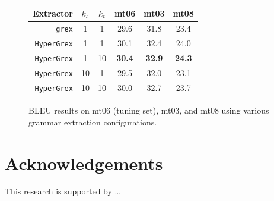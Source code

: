 \documentclass[nofonts]{pbml} %
\begin{document}
\begin{figure}[ht!]
\centering
\begin{tabular}{r c c c c c}
Extractor & $k_s$ & $k_t$ & mt06 & mt03 & mt08 \\
\hline
\texttt{grex}      &  1 &  1 & 29.6 & 31.8 & 23.4 \\
\texttt{HyperGrex} &  1 &  1 & 30.1 & 32.4 & 24.0 \\
\texttt{HyperGrex} &  1 & 10 & \textbf{30.4} & \textbf{32.9} & \textbf{24.3} \\
\texttt{HyperGrex} & 10 &  1 & 29.5 & 32.0 & 23.1 \\
\texttt{HyperGrex} & 10 & 10 & 30.0 & 32.7 & 23.7 \\
\end{tabular}
\caption{\textsc{BLEU} results on mt06 (tuning set), mt03, and mt08 using various grammar extraction configurations.}
\label{bleuresults}
\end{figure}

\section*{Acknowledgements}
This research is supported by \ldots



\correspondingaddress
\end{document}
